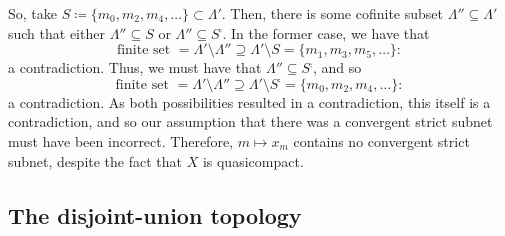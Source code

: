 \begin{exm}
So, take $S\coloneqq \{ m_0,m_2,m_4,\ldots \} \subset \Lambda '$.  Then, there is some cofinite subset $\Lambda ''\subseteq \Lambda '$ such that either $\Lambda ''\subseteq S$ or $\Lambda ''\subseteq S^{\comp}$.  In the former case, we have that
\begin{equation}
\text{finite set }=\Lambda '\setminus \Lambda '' \supseteq \Lambda '\setminus S=\{ m_1,m_3,m_5,\ldots \} :
\end{equation}
a contradiction.  Thus, we must have that $\Lambda ''\subseteq S^{\comp}$, and so
\begin{equation}
\text{finite set }=\Lambda '\setminus \Lambda ''\supseteq \Lambda '\setminus S^{\comp}=\{ m_0,m_2,m_4,\ldots \} :
\end{equation}
a contradiction.  As both possibilities resulted in a contradiction, this itself is a contradiction, and so our assumption that there was a convergent strict subnet must have been incorrect.  Therefore, $m\mapsto x_m$ contains no convergent strict subnet, despite the fact that $X$ is quasicompact.
\end{exm}

\subsection{The disjoint-union topology}

